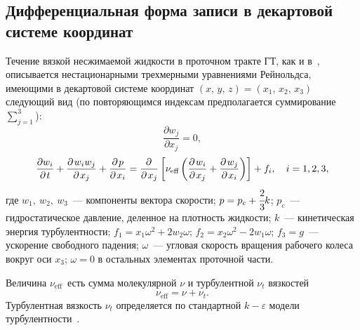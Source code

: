 \subsection{Дифференциальная форма записи в декартовой системе координат}
\label{s:111}
Течение вязкой несжимаемой жидкости в проточном тракте ГТ, как и в~\cite{Cher}, описывается нестационарными 
трехмерными уравнениями Рейнольдса, имеющими в декартовой системе координат
$\left( {x,\,y,\,z} \right) = \left( {x_1 ,\,x_2 ,\,x_3 } \right)$ следующий вид (по повторяющимся индексам 
предполагается суммирование $\sum\limits_{j=1}^3$):
\begin{equation}
  \label{1} 
  \frac{{\partial w_j }}{{\partial x_j }} = 0,
\end{equation}
\begin{equation}
  \label{2} 
  \frac{{\partial w_i }}{{\partial {\kern 1pt} t}} +
  \frac{{\partial {\kern 1pt} w_i w_j }}{{\partial {\kern 1pt} x_j}} + 
  \frac{{\partial {\kern 1pt} p}}{{\partial {\kern 1pt} x_i }} = 
  \frac{{\partial {\kern 1pt} }}{{\partial {\kern 1pt} x_j}}
  \left[ {\nu _{\text{eff}} \left( {\frac{{\partial {\kern 1pt} w_i }}{{\partial {\kern 1pt} x_j }} + 
  \frac{{\partial {\kern 1pt} w_j }}{{\partial {\kern 1pt} x_i }}} \right)} \right] + f_i,
  \ \ \ i = 1,2,3,
\end{equation}
где $ w_1 ,\ w_2 ,\ w_3$~--- компоненты вектора скорости; $p = p_c + \cfrac{2}{3}k$;  $p_c$~--- 
гидростатическое давление, деленное на плотность жидкости; $k$~--- кинетическая энергия турбулентности;
$f_1=x_1\omega^2+2w_2\omega$; $f_2=x_2\omega^2-2w_1\omega$; $f_3=g$~--- ускорение свободного падения;
$\omega$~--- угловая скорость вращения рабочего колеса вокруг оси $x_3$;  $\omega=0$ в остальных элементах 
проточной части.

Величина $\nu _{\text{eff}}$\, есть сумма молекулярной $\nu$ и турбулентной $\nu_t$ вязкостей
\begin{equation}
  \label{3} 
  \nu _{\text{eff}} = \nu  + \nu _t.
\end{equation}
Турбулентная вязкость $\nu_t$ определяется по стандартной $k - \varepsilon $ модели 
турбулентности~\cite{sharma}.

